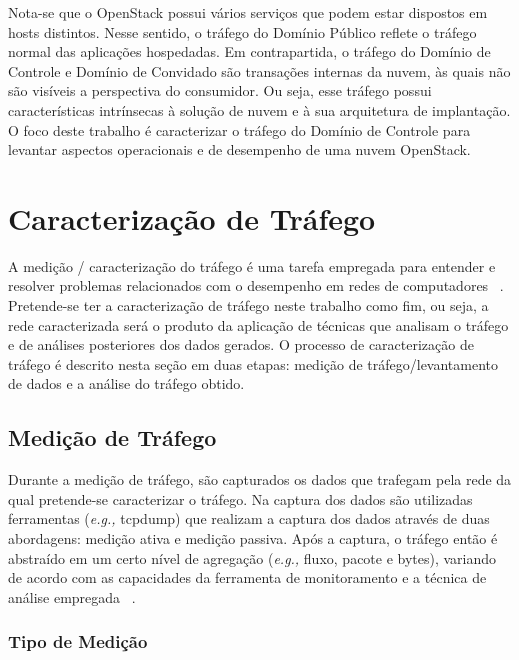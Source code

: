 Nota-se que o OpenStack possui vários serviços que podem estar dispostos em hosts distintos. 
%
Nesse sentido, o tráfego do Domínio Público reflete o tráfego normal das aplicações hospedadas.
%
Em contrapartida, o tráfego do Domínio de Controle e Domínio de Convidado são transações internas da nuvem, às quais não são visíveis a perspectiva do consumidor.
%
Ou seja, esse tráfego possui características intrínsecas à solução de nuvem e à sua arquitetura de implantação.
%
O foco deste trabalho é caracterizar o tráfego do Domínio de Controle para levantar aspectos operacionais e de desempenho de uma nuvem OpenStack.

\section{Caracterização de Tráfego}
\label{cap2:caracterizacao}

A medição / caracterização do tráfego é uma tarefa empregada para entender e resolver problemas relacionados com o desempenho em redes de computadores ~\cite{dainotti:2006:packetcharacterization}. 
%
Pretende-se ter a caracterização de tráfego neste trabalho como fim, ou seja, a rede caracterizada será o produto da aplicação de técnicas que analisam o tráfego e de análises posteriores dos dados gerados.
%
O processo de caracterização de tráfego é descrito nesta seção em duas etapas: medição de tráfego/levantamento de dados e a análise do tráfego obtido.
%

\subsection{Medição de Tráfego}

Durante a medição de tráfego, são capturados os dados que trafegam pela rede da qual pretende-se caracterizar o tráfego.
%
Na captura dos dados são utilizadas ferramentas (\textit{e.g.,} tcpdump) que realizam a captura dos dados através de duas abordagens: medição ativa e medição passiva.
%
Após a captura, o tráfego então é abstraído em um certo nível de agregação (\textit{e.g.,} fluxo, pacote e bytes), variando de acordo com as capacidades da ferramenta de monitoramento e a técnica de análise empregada  ~\cite{dainotti:2006:packetcharacterization}.

\subsubsection{Tipo de Medição}

